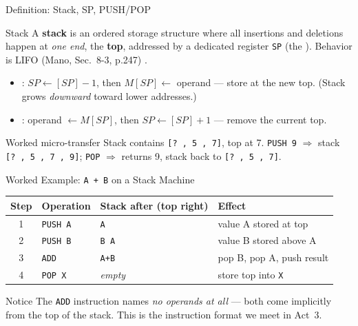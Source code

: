 \documentclass[aspectratio=169]{beamer}
\begin{document}
\begin{frame}{Definition: Stack, SP, PUSH/POP}
  \begin{block}{Stack}
    A \textbf{stack} is an ordered storage structure where all insertions and
    deletions happen at \emph{one end}, the \textbf{top}, addressed by a
    dedicated register \texttt{SP} (the ). Behavior is
    LIFO (Mano, Sec.~8-3, p.247) \cite{Mano1993_computer_system_architecture}.
  \end{block}
  \begin{itemize}
    \item {}: $SP \gets [SP] - 1$, then $M[SP] \gets$ operand --- store
      at the new top. (Stack grows \emph{downward} toward lower addresses.)
    \item {}: operand $\gets M[SP]$, then $SP \gets [SP] + 1$ --- remove
      the current top.
  \end{itemize}
  \begin{exampleblock}{Worked micro-transfer}
    Stack contains \texttt{[? , 5 , 7]}, top at 7. \texttt{PUSH 9}
    $\Rightarrow$ stack \texttt{[? , 5 , 7 , 9]}; \texttt{POP} $\Rightarrow$
    returns 9, stack back to \texttt{[? , 5 , 7]}.
  \end{exampleblock}
\end{frame}

\begin{frame}{Worked Example: \texttt{A + B} on a Stack Machine}
  \footnotesize
  \begin{tabular}{@{}clp{4.2cm}p{4.2cm}@{}}
    \toprule
    \textbf{Step} & \textbf{Operation} & \textbf{Stack after (top right)} & \textbf{Effect} \\
    \midrule
    1 & \texttt{PUSH A} & \texttt{A} & value A stored at top \\
    2 & \texttt{PUSH B} & \texttt{B A} & value B stored above A \\
    3 & \texttt{ADD}    & \texttt{A+B} & pop B, pop A, push result \\
    4 & \texttt{POP X}  & \emph{empty} & store top into \texttt{X} \\
    \bottomrule
  \end{tabular}
  \vspace{0.3cm}
  \begin{alertblock}{Notice}
    The \texttt{ADD} instruction names \emph{no operands at all} --- both come
    implicitly from the top of the stack. This is the 
    instruction format we meet in Act~3.
  \end{alertblock}
\end{frame}
\end{document}
